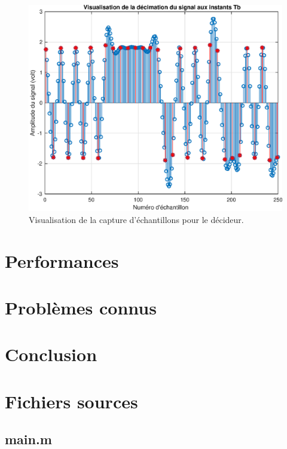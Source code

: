 \documentclass[10pt, oneside, a4paper]{article}
\begin{document}
\begin{figure}[p]
    \centering
    \includegraphics[height=0.45\textheight]{eps/decimate.eps}
    \caption{Visualisation de la capture d'échantillons pour le décideur.}
    \label{fig:decimate}
\end{figure}


\section{Performances}


\section{Problèmes connus}


\section*{Conclusion}

\appendix
\clearpage

\section{Fichiers sources}
\label{sec:fichiers-sources}

\subsection{main.m}
\inputminted{matlab}{../main.m}
\label{app:main}
\end{document}
